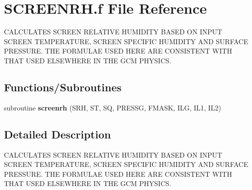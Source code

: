 \hypertarget{SCREENRH_8f}{}\section{S\+C\+R\+E\+E\+N\+R\+H.\+f File Reference}
\label{SCREENRH_8f}


C\+A\+L\+C\+U\+L\+A\+T\+E\+S S\+C\+R\+E\+E\+N R\+E\+L\+A\+T\+I\+V\+E H\+U\+M\+I\+D\+I\+T\+Y B\+A\+S\+E\+D O\+N I\+N\+P\+U\+T S\+C\+R\+E\+E\+N T\+E\+M\+P\+E\+R\+A\+T\+U\+R\+E, S\+C\+R\+E\+E\+N S\+P\+E\+C\+I\+F\+I\+C H\+U\+M\+I\+D\+I\+T\+Y A\+N\+D S\+U\+R\+F\+A\+C\+E P\+R\+E\+S\+S\+U\+R\+E. T\+H\+E F\+O\+R\+M\+U\+L\+A\+E U\+S\+E\+D H\+E\+R\+E A\+R\+E C\+O\+N\+S\+I\+S\+T\+E\+N\+T W\+I\+T\+H T\+H\+A\+T U\+S\+E\+D E\+L\+S\+E\+W\+H\+E\+R\+E I\+N T\+H\+E G\+C\+M P\+H\+Y\+S\+I\+C\+S.  


\subsection*{Functions/\+Subroutines}
\begin{DoxyCompactItemize}
\item 
\hypertarget{SCREENRH_8f_a619c7e9b0317e5918565e3fb98936b4b}{}subroutine {\bfseries screenrh} (S\+R\+H, S\+T, S\+Q, P\+R\+E\+S\+S\+G, F\+M\+A\+S\+K, I\+L\+G, I\+L1, I\+L2)\label{SCREENRH_8f_a619c7e9b0317e5918565e3fb98936b4b}

\end{DoxyCompactItemize}


\subsection{Detailed Description}
C\+A\+L\+C\+U\+L\+A\+T\+E\+S S\+C\+R\+E\+E\+N R\+E\+L\+A\+T\+I\+V\+E H\+U\+M\+I\+D\+I\+T\+Y B\+A\+S\+E\+D O\+N I\+N\+P\+U\+T S\+C\+R\+E\+E\+N T\+E\+M\+P\+E\+R\+A\+T\+U\+R\+E, S\+C\+R\+E\+E\+N S\+P\+E\+C\+I\+F\+I\+C H\+U\+M\+I\+D\+I\+T\+Y A\+N\+D S\+U\+R\+F\+A\+C\+E P\+R\+E\+S\+S\+U\+R\+E. T\+H\+E F\+O\+R\+M\+U\+L\+A\+E U\+S\+E\+D H\+E\+R\+E A\+R\+E C\+O\+N\+S\+I\+S\+T\+E\+N\+T W\+I\+T\+H T\+H\+A\+T U\+S\+E\+D E\+L\+S\+E\+W\+H\+E\+R\+E I\+N T\+H\+E G\+C\+M P\+H\+Y\+S\+I\+C\+S. 

